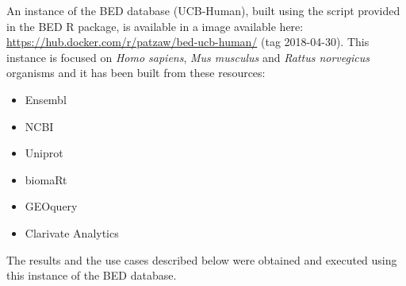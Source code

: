 \documentclass[9pt,a4paper,]{extarticle}
\theoremstyle{definition}
\theoremstyle{definition}
\theoremstyle{definition}
\theoremstyle{remark}
\begin{document}
An instance of the BED database (UCB-Human),
built using the script provided
in the BED R package, is available in a \docker{}
image \citep{docker_inc_docker_2017} available here:
\url{https://hub.docker.com/r/patzaw/bed-ucb-human/} (tag 2018-04-30).
This instance
is focused on \emph{Homo sapiens}, \emph{Mus musculus} and \emph{Rattus norvegicus} organisms
and it has been built from these resources:

\begin{itemize}
\item
  Ensembl \citep{zerbino_ensembl_2017}
\item
  NCBI \citep{ncbi_resource_coordinators_database_2017}
\item
  Uniprot \citep{the_uniprot_consortium_uniprot:_2017}
\item
  biomaRt \citep{durinck_mapping_2009}
\item
  GEOquery \citep{davis_geoquery:_2007}
\item
  Clarivate Analytics \metabase{} \citep{clarivate_analytics_metacore_2017}
\end{itemize}

The results and the use cases described below were obtained and executed
using this instance of the BED database.
\end{document}
